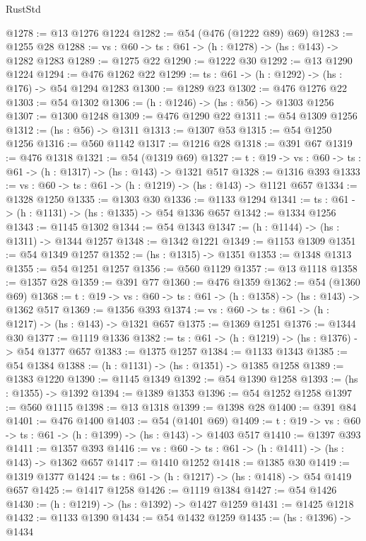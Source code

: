 \begin{lexlean}{RustStd}
\begin{coremodule}
@1278 := @13 @1276 @1224
@1282 := @54 (@476 (@1222 @89) @69)
@1283 := @1255 @28
@1288 := {vs : @60} -> {ts : @61} -> (h : @1278) -> (hs : @143) -> @1282 @1283
@1289 := @1275 @22
@1290 := @1222 @30
@1292 := @13 @1290 @1224
@1294 := @476 @1262 @22
@1299 := {ts : @61} -> (h : @1292) -> (hs : @176) -> @54 @1294 @1283
@1300 := @1289 @23
@1302 := @476 @1276 @22
@1303 := @54 @1302
@1306 := (h : @1246) -> (hs : @56) -> @1303 @1256
@1307 := @1300 @1248
@1309 := @476 @1290 @22
@1311 := @54 @1309 @1256
@1312 := (hs : @56) -> @1311
@1313 := @1307 @53
@1315 := @54 @1250 @1256
@1316 := @560 @1142
@1317 := @1216 @28
@1318 := @391 @67
@1319 := @476 @1318
@1321 := @54 (@1319 @69)
@1327 := {t : @19} -> {vs : @60} -> {ts : @61} -> (h : @1317) -> (hs : @143) -> @1321 @517
@1328 := @1316 @393
@1333 := {vs : @60} -> {ts : @61} -> (h : @1219) -> (hs : @143) -> @1121 @657
@1334 := @1328 @1250
@1335 := @1303 @30
@1336 := @1133 @1294
@1341 := {ts : @61} -> (h : @1131) -> (hs : @1335) -> @54 @1336 @657
@1342 := @1334 @1256
@1343 := @1145 @1302
@1344 := @54 @1343
@1347 := (h : @1144) -> (hs : @1311) -> @1344 @1257
@1348 := @1342 @1221
@1349 := @1153 @1309
@1351 := @54 @1349 @1257
@1352 := (hs : @1315) -> @1351
@1353 := @1348 @1313
@1355 := @54 @1251 @1257
@1356 := @560 @1129
@1357 := @13 @1118
@1358 := @1357 @28
@1359 := @391 @77
@1360 := @476 @1359
@1362 := @54 (@1360 @69)
@1368 := {t : @19} -> {vs : @60} -> {ts : @61} -> (h : @1358) -> (hs : @143) -> @1362 @517
@1369 := @1356 @393
@1374 := {vs : @60} -> {ts : @61} -> (h : @1217) -> (hs : @143) -> @1321 @657
@1375 := @1369 @1251
@1376 := @1344 @30
@1377 := @1119 @1336
@1382 := {ts : @61} -> (h : @1219) -> (hs : @1376) -> @54 @1377 @657
@1383 := @1375 @1257
@1384 := @1133 @1343
@1385 := @54 @1384
@1388 := (h : @1131) -> (hs : @1351) -> @1385 @1258
@1389 := @1383 @1220
@1390 := @1145 @1349
@1392 := @54 @1390 @1258
@1393 := (hs : @1355) -> @1392
@1394 := @1389 @1353
@1396 := @54 @1252 @1258
@1397 := @560 @1115
@1398 := @13 @1318
@1399 := @1398 @28
@1400 := @391 @84
@1401 := @476 @1400
@1403 := @54 (@1401 @69)
@1409 := {t : @19} -> {vs : @60} -> {ts : @61} -> (h : @1399) -> (hs : @143) -> @1403 @517
@1410 := @1397 @393
@1411 := @1357 @393
@1416 := {vs : @60} -> {ts : @61} -> (h : @1411) -> (hs : @143) -> @1362 @657
@1417 := @1410 @1252
@1418 := @1385 @30
@1419 := @1319 @1377
@1424 := {ts : @61} -> (h : @1217) -> (hs : @1418) -> @54 @1419 @657
@1425 := @1417 @1258
@1426 := @1119 @1384
@1427 := @54 @1426
@1430 := (h : @1219) -> (hs : @1392) -> @1427 @1259
@1431 := @1425 @1218
@1432 := @1133 @1390
@1434 := @54 @1432 @1259
@1435 := (hs : @1396) -> @1434

\end{coremodule}
\end{lexlean}
